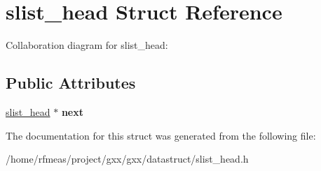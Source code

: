 \hypertarget{structslist__head}{}\section{slist\+\_\+head Struct Reference}
\label{structslist__head}


Collaboration diagram for slist\+\_\+head\+:
\subsection*{Public Attributes}
\begin{DoxyCompactItemize}
\item 
\hyperlink{structslist__head}{slist\+\_\+head} $\ast$ {\bfseries next}\hypertarget{structslist__head_abe09773660684f4b8d5cac0a721ebb6a}{}\label{structslist__head_abe09773660684f4b8d5cac0a721ebb6a}

\end{DoxyCompactItemize}


The documentation for this struct was generated from the following file\+:\begin{DoxyCompactItemize}
\item 
/home/rfmeas/project/gxx/gxx/datastruct/slist\+\_\+head.\+h\end{DoxyCompactItemize}
